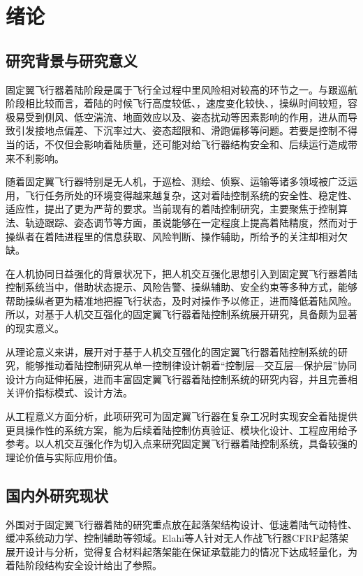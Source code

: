 
\chapter{绪论}

\section{研究背景与研究意义}

固定翼飞行器着陆阶段是属于飞行全过程中里风险相对较高的环节之一。与跟巡航阶段相比较而言，着陆的时候飞行高度较低、，速度变化较快、，操纵时间较短，容极易受到侧风、低空湍流、地面效应以及、姿态扰动等因素影响的作用，进从而导致引发接地点偏差、下沉率过大、姿态超限和、滑跑偏移等问题。若要是控制不得当的话，不仅但会影响着陆质量，还可能对给飞行器结构安全和、后续运行造成带来不利影响。

随着固定翼飞行器特别是无人机，于巡检、测绘、侦察、运输等诸多领域被广泛运用，飞行任务所处的环境变得越来越复杂，这对着陆控制系统的安全性、稳定性、适应性，提出了更为严苛的要求。当前现有的着陆控制研究，主要聚焦于控制算法、轨迹跟踪、姿态调节等方面，虽说能够在一定程度上提高着陆精度，然而对于操纵者在着陆进程里的信息获取、风险判断、操作辅助，所给予的关注却相对欠缺。

在人机协同日益强化的背景状况下，把人机交互强化思想引入到固定翼飞行器着陆控制系统当中，借助状态提示、风险告警、操纵辅助、安全约束等多种方式，能够帮助操纵者更为精准地把握飞行状态，及时对操作予以修正，进而降低着陆风险。所以，对基于人机交互强化的固定翼飞行器着陆控制系统展开研究，具备颇为显著的现实意义。

从理论意义来讲，展开对于基于人机交互强化的固定翼飞行器着陆控制系统的研究，能够推动着陆控制研究从单一控制律设计朝着``控制层---交互层---保护层''协同设计方向延伸拓展，进而丰富固定翼飞行器着陆控制系统的研究内容，并且完善相关评价指标模式、设计方法。

从工程意义方面分析，此项研究可为固定翼飞行器在复杂工况时实现安全着陆提供更具操作性的系统方案，能为后续着陆控制仿真验证、模块化设计、工程应用给予参考。以人机交互强化作为切入点来研究固定翼飞行器着陆控制系统，具备较强的理论价值与实际应用价值。

\section{国内外研究现状}

外国对于固定翼飞行器着陆的研究重点放在起落架结构设计、低速着陆气动特性、缓冲系统动力学、控制辅助等领域。Elahi等人针对无人作战飞行器CFRP起落架展开设计与分析，觉得复合材料起落架能在保证承载能力的情况下达成轻量化，为着陆阶段结构安全设计给出了参照。

